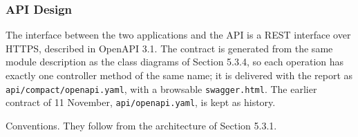 \subsubsection{API Design}

The interface between the two applications and the API is a REST interface over HTTPS, described in OpenAPI 3.1. The contract is generated from the same module description as the class diagrams of Section 5.3.4, so each operation has exactly one controller method of the same name; it is delivered with the report as \texttt{api/\allowbreak{}compact/\allowbreak{}openapi.\allowbreak{}yaml}, with a browsable \texttt{swagger.\allowbreak{}html}. The earlier contract of 11 November, \texttt{api/\allowbreak{}openapi.\allowbreak{}yaml}, is kept as history.

Conventions. They follow from the architecture of Section 5.3.1.

